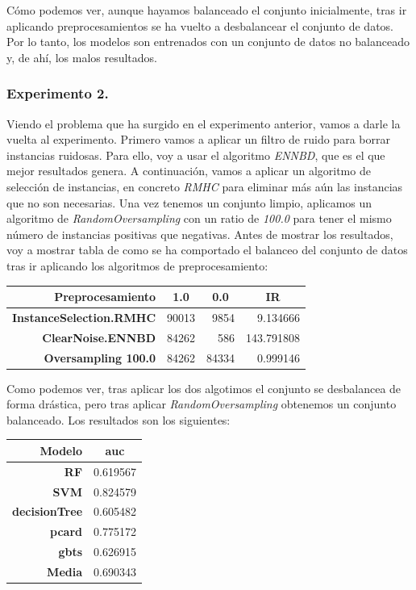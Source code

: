 \documentclass[11pt]{article}
\begin{document}
Cómo podemos ver, aunque hayamos balanceado el conjunto inicialmente, tras ir aplicando preprocesamientos se ha vuelto a desbalancear el conjunto de datos. Por lo tanto, los modelos son entrenados con un conjunto de datos no balanceado y, de ahí, los malos resultados.

\subsubsection{Experimento 2.}

Viendo el problema que ha surgido en el experimento anterior, vamos a darle la vuelta al experimento. Primero vamos a aplicar un filtro de ruido para borrar instancias ruidosas. Para ello, voy a usar el algoritmo \textit{ENNBD}, que es el que mejor resultados genera. A continuación, vamos a aplicar un algoritmo de selección de instancias, en concreto \textit{RMHC} para eliminar más aún las instancias que no son necesarias. Una vez tenemos un conjunto limpio, aplicamos un algoritmo de \textit{RandomOversampling} con un ratio de \textit{100.0} para tener el mismo número de instancias positivas que negativas. Antes de mostrar los resultados, voy a mostrar tabla de como se ha comportado el balanceo del conjunto de datos tras ir aplicando los algoritmos de preprocesamiento: 

\begin{table}[H]
	\centering
	\begin{tabular}{rrrr}
		\textbf{Preprocesamiento} & \multicolumn{1}{c}{\textbf{1.0}} & \multicolumn{1}{c}{\textbf{0.0}} & \multicolumn{1}{c}{\textbf{IR}} \\ \hline
		\textbf{InstanceSelection.RMHC} & 90013 & 9854 & 9.134666 \\
		\textbf{ClearNoise.ENNBD} & 84262 & 586 & 143.791808 \\
		\textbf{Oversampling 100.0} & 84262 & 84334 & 0.999146
	\end{tabular}
\end{table}

Como podemos ver, tras aplicar los dos algotimos el conjunto se desbalancea de forma drástica, pero tras aplicar \textit{RandomOversampling} obtenemos un conjunto balanceado. Los resultados son los siguientes:

\begin{table}[H]
	\centering
	\begin{tabular}{rr}
		\textbf{Modelo} & \multicolumn{1}{c}{\textbf{auc}} \\ \hline
		\textbf{RF} & 0.619567 \\
		\textbf{SVM} & 0.824579 \\
		\textbf{decisionTree} & 0.605482 \\
		\textbf{pcard} & 0.775172 \\
		\textbf{gbts} & 0.626915 \\ \hline
		\textbf{Media} & 0.690343
	\end{tabular}
\end{table}
\end{document}
